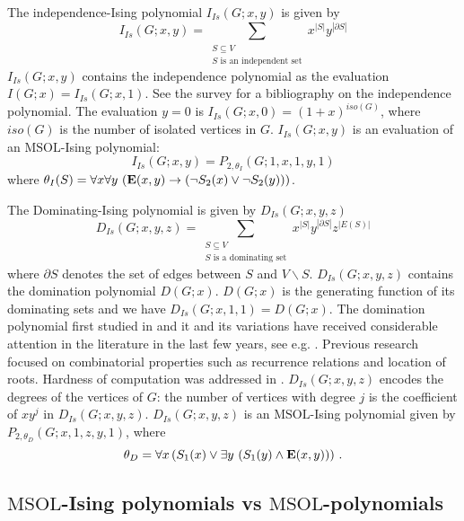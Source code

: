 \documentclass{llncs}
\newcommand{\MSOL}{\mathrm{MSOL}}
\begin{document}
\begin{example}
 The independence-Ising polynomial
$I_{Is}(G;x,y)$ is given by
\[
I_{Is}(G;x,y)=\sum_{\substack{S\subseteq V\\
S\mbox{ is an independent set}
}
}x^{|S|}y^{|\partial S|}
\]
$I_{Is}(G;x,y)$ contains the independence polynomial as the evaluation
$I(G;x)=I_{Is}(G;x,1)$. See the survey \cite{levit2005independence}
for a bibliography on the independence polynomial. The evaluation
$y=0$ is $I_{Is}(G;x,0)=(1+x)^{\mathit{iso}(G)}$, where $\mathit{iso}(G)$
is the number of isolated vertices in $G$. $I_{Is}(G;x,y)$ is an
evaluation of an $\MSOL$-Ising polynomial: 
\[
I_{Is}(G;x,y)=P_{2,\theta_{I}}(G;1,x,1,y,1)
\]
where $\theta_{I}(S)=\forall x\forall y\,\left({\bf E}(x,y)\to\left(\neg S_2(x)\lor\neg S_2(y)\right)\right)$. 
\end{example}

\begin{example}
 The Dominating-Ising polynomial is
given by $D_{Is}(G;x,y,z)$ 
\[
D_{Is}(G;x,y,z)=\sum_{\substack{S\subseteq V\\
S\mbox{ is a dominating set}
}
}x^{|S|}y^{|\partial S|}z^{|E(S)|}
\]
where $\partial S$ denotes the set of edges between $S$ and $V\backslash S$.
$D_{Is}(G;x,y,z)$ contains the domination polynomial $D(G;x)$. $D(G;x)$
is the generating function of its dominating sets and we have $D_{Is}(G;x,1,1)=D(G;x)$.
The domination polynomial first studied in \cite{arocha2000mean}
and it and its variations have received considerable attention in
the literature in the last few years, see e.g. \cite{alikhani2009dominating,akbari2010zeros,akbari2010characterization,alaeiyan2011cyclically,DBLP:journals/combinatorics/KotekPSTT12,DBLP:journals/gc/KotekPT14,DBLP:journals/arscom/AkbariO14,alikhani2014introduction,brown2014roots,kahat2014dominating,DBLP:journals/dmgt/DodKPT15}.
Previous research focused on combinatorial properties such as recurrence
relations and location of roots. Hardness of computation was addressed
in \cite{kotek2013domination}. $D_{Is}(G;x,y,z)$ encodes the degrees
of the vertices of $G$: the number of vertices with degree $j$ is
the coefficient of $xy^{j}$ in $D_{Is}(G;x,y,z)$. $D_{Is}(G;x,y,z)$
is an $\MSOL$-Ising polynomial given by $P_{2,\theta_{D}}(G;x,1,z,y,1)$,
where 
\[\theta_{D}=\forall x\left(S_1(x)\lor\exists y\,\left(S_1(y)\land{\bf E}(x,y)\right)\right)\,.\]
\end{example}


\subsection{$\MSOL$-Ising polynomials vs $\MSOL$-polynomials}
\end{document}
